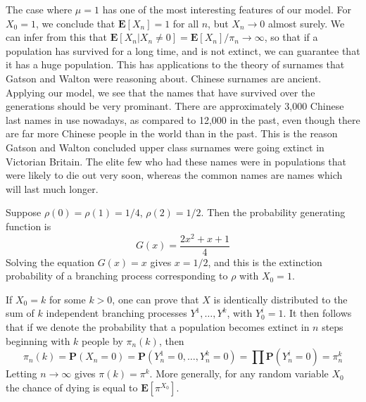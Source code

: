 %
The case where $\mu = 1$ has one of the most interesting features of our model. For $X_0 = 1$, we conclude that $\mathbf{E}[X_n] = 1$ for all $n$, but $X_n \to 0$ almost surely. We can infer from this that $\mathbf{E}[X_n|X_n \neq 0] = \mathbf{E}[X_n]/\pi_n \to \infty$, so that if a population has survived for a long time, and is not extinct, we can guarantee that it has a huge population. This has applications to the theory of surnames that Gatson and Walton were reasoning about. Chinese surnames are ancient. Applying our model, we see that the names that have survived over the generations should be very prominant. There are approximately 3,000 Chinese last names in use nowadays, as compared to 12,000 in the past, even though there are far more Chinese people in the world than in the past. This is the reason Gatson and Walton concluded upper class surnames were going extinct in Victorian Britain. The elite few who had these names were in populations that were likely to die out very soon, whereas the common names are names which will last much longer.

\begin{example}
    Suppose $\rho(0) = \rho(1) = 1/4$, $\rho(2) = 1/2$. Then the probability generating function is
    \[ G(x) = \frac{2x^2 + x + 1}{4} \]
    Solving the equation $G(x) = x$ gives $x = 1/2$, and this is the extinction probability of a branching process corresponding to $\rho$ with $X_0 = 1$.
\end{example}

If $X_0 = k$ for some $k > 0$, one can prove that $X$ is identically distributed to the sum of $k$ independent branching processes $Y^1, \dots, Y^k$, with $Y^i_0 = 1$. It then follows that if we denote the probability that a population becomes extinct in $n$ steps beginning with $k$ people by $\pi_n(k)$, then
%
\[ \pi_n(k) = \mathbf{P}(X_n = 0) = \mathbf{P}(Y^1_n = 0, \dots, Y^k_n = 0) = \prod \mathbf{P}(Y^i_n = 0) = \pi_n^k \]
%
Letting $n \to \infty$ gives $\pi(k) = \pi^k$. More generally, for any random variable $X_0$ the chance of dying is equal to $\mathbf{E}[\pi^{X_0}]$.

